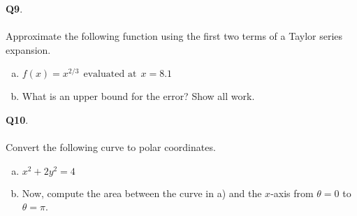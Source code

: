 \documentclass[12pt, oneside]{amsart}
\begin{document}
\noindent
\textbf{Q9}. \\ \\ Approximate the following function using the first two terms of a Taylor series expansion. \\
\begin{enumerate}[a)]
  \item
    $\displaystyle{f(x)=x^{2/3}} \ \ \text{evaluated at} \ \ x=8.1$
    \vspace{11cm}
  \item
What is an upper bound for the error? Show all work. 
  \newpage
\end{enumerate}

\noindent
\textbf{Q10}. \\ \\ Convert the following curve to polar coordinates.  \\ 
\begin{enumerate}[a)]
  \item
    $\displaystyle{x^{2} + 2y^{2} = 4}$
\vspace{9cm}
\item
Now, compute the area between the curve in a) and the $x$-axis from $\theta = 0$ to $\theta = \pi$.
  \newpage
\end{enumerate}
\end{document}
